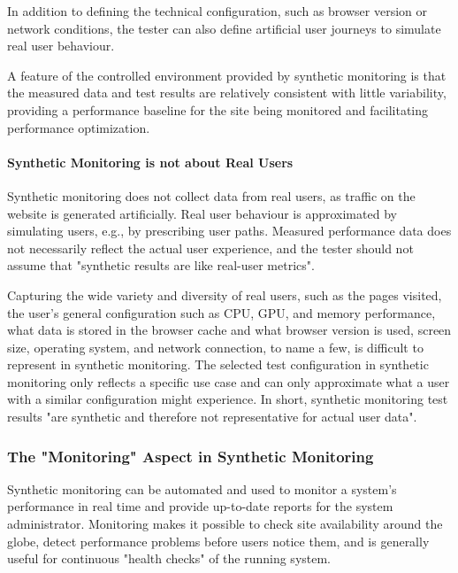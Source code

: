 In addition to defining the technical configuration, such as browser version or network conditions, the tester can also define artificial user journeys to simulate real user behaviour. %

A feature of the controlled environment provided by synthetic monitoring is that the measured data and test results are relatively consistent with little variability, providing a performance baseline for the site being monitored and facilitating performance optimization. %


\paragraph{Synthetic Monitoring is not about Real Users} %


Synthetic monitoring does not collect data from real users, as traffic on the website is generated artificially.
Real user behaviour is approximated by simulating users, e.g., by prescribing user paths.
Measured performance data does not necessarily reflect the actual user experience, and the tester should not assume that "synthetic results are like real-user metrics". %

Capturing the wide variety and diversity of real users, such as the pages visited, the user's general configuration such as CPU, GPU, and memory performance, what data is stored in the browser cache and what browser version is used, screen size, operating system, and network connection, to name a few, is difficult to represent in synthetic monitoring. %
The selected test configuration in synthetic monitoring only reflects a specific use case and can only approximate what a user with a similar configuration might experience. %
In short, synthetic monitoring test results "are synthetic and therefore not representative for actual user data".  %


\subsubsection{The "Monitoring" Aspect in Synthetic Monitoring} %

Synthetic monitoring can be automated and used to monitor a system's performance in real time and provide up-to-date reports for the system administrator. %
Monitoring makes it possible to check site availability around the globe, %
detect performance problems before users notice them, %
and is generally useful for continuous "health checks" of the running system.  %

